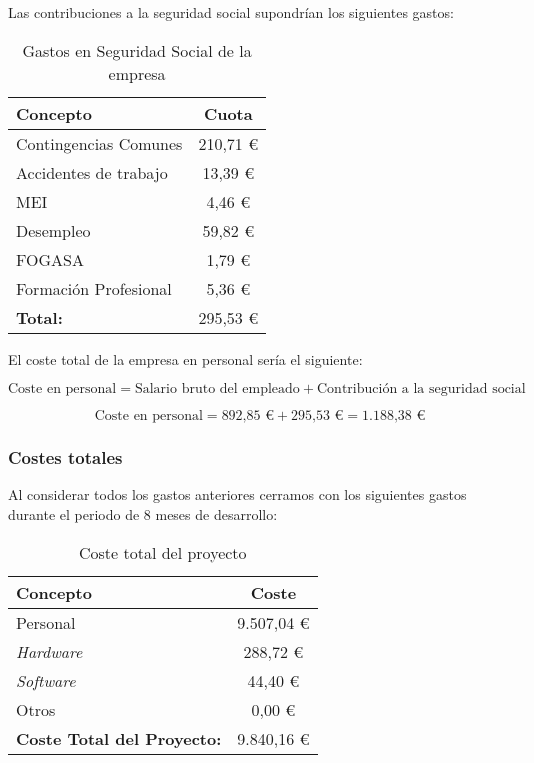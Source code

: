 Las contribuciones a la seguridad social supondrían los siguientes gastos:

\begin{table}[h!]
	\centering
	\begin{tabular}{| l | c |}
		\toprule
		\textbf{Concepto} & \textbf{Cuota} \\ \midrule
		Contingencias Comunes & 210,71 € \\
		Accidentes de trabajo & 13,39 € \\
		MEI & 4,46 € \\
		Desempleo & 59,82 € \\
		FOGASA & 1,79 € \\
		Formación Profesional & 5,36 € \\
		\midrule
		\textbf{Total:} & 295,53 € \\
		\bottomrule
	\end{tabular}
	\caption{Gastos en Seguridad Social de la empresa}
	\label{SSempresagastos}
\end{table}


El coste total de la empresa en personal sería el siguiente:

\[
\text{Coste en personal} = \text{Salario bruto del empleado} + \text{Contribución a la seguridad social}
\]

\[
\text{Coste en personal} = \text{892,85 €} + \text{295,53 €} = \text{1.188,38 €}
\]

%
%

\subsubsection{Costes totales}
Al considerar todos los gastos anteriores cerramos con los siguientes gastos durante el periodo de 8 meses de desarrollo:

\begin{table}[h!]
	\centering
	\begin{tabular}{| l | c |}
		\hline
		\textbf{Concepto} & \textbf{Coste} \\ \hline
		Personal & 9.507,04 €\\
		\textit{Hardware} & 288,72  € \\
		\textit{Software} & 44,40 €\\
		Otros & 0,00 €\\
		
		\hline
		\textbf{Coste Total del Proyecto:} & 9.840,16 € \\
		\hline
	\end{tabular}
	\caption{Coste total del proyecto}
	\label{Costproject}
\end{table}

